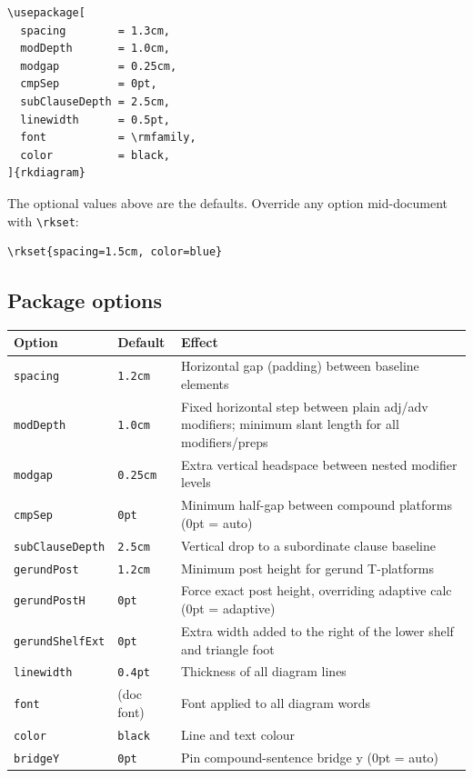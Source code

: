 \documentclass[11pt]{article}
\newcommand{\cmd}[1]{\texttt{\textbackslash #1}}
\newcommand{\opt}[1]{\texttt{#1}}
\begin{document}
\begin{lstlisting}
\usepackage[
  spacing        = 1.3cm,
  modDepth       = 1.0cm,
  modgap         = 0.25cm,
  cmpSep         = 0pt,
  subClauseDepth = 2.5cm,
  linewidth      = 0.5pt,
  font           = \rmfamily,
  color          = black,
]{rkdiagram}
\end{lstlisting}

The optional values above are the defaults.
Override any option mid-document with \cmd{rkset}:

\begin{lstlisting}
\rkset{spacing=1.5cm, color=blue}
\end{lstlisting}

\subsection*{Package options}

\begin{tabular}{@{}l l p{8cm}@{}}
  \toprule
  Option & Default & Effect \\
  \midrule
  \opt{spacing}        & \opt{1.2cm}  & Horizontal gap (padding) between baseline elements \\
  \opt{modDepth}       & \opt{1.0cm}  & Fixed horizontal step between plain adj/adv modifiers; minimum slant length for all modifiers/preps \\
  \opt{modgap}         & \opt{0.25cm} & Extra vertical headspace between nested modifier levels \\
  \opt{cmpSep}         & \opt{0pt}    & Minimum half-gap between compound platforms (0pt = auto) \\
  \opt{subClauseDepth} & \opt{2.5cm}  & Vertical drop to a subordinate clause baseline \\
  \opt{gerundPost}     & \opt{1.2cm}  & Minimum post height for gerund T-platforms \\
  \opt{gerundPostH}    & \opt{0pt}    & Force exact post height, overriding adaptive calc (0pt = adaptive) \\
  \opt{gerundShelfExt} & \opt{0pt}    & Extra width added to the right of the lower shelf and triangle foot \\
  \opt{linewidth}      & \opt{0.4pt}  & Thickness of all diagram lines \\
  \opt{font}           & (doc font)   & Font applied to all diagram words \\
  \opt{color}          & \opt{black}  & Line and text colour \\
  \opt{bridgeY}        & \opt{0pt}    & Pin compound-sentence bridge y (0pt = auto) \\
  \bottomrule
\end{tabular}
\end{document}
